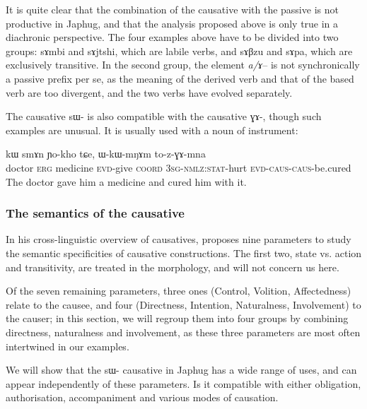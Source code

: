\documentclass[oldfontcommands,oneside,a4paper,11pt]{memoir}
\newcommand{\ipa}[1]{{\phon #1}} %
\newcommand{\wav}[1]{}%
\newcommand{\caus}{\textsc{caus}}
\newcommand{\coord}{\textsc{coord}}
\newcommand{\erg}{\textsc{erg}}
\newcommand{\evd}{\textsc{evd}}
\newcommand{\nmlz}{\textsc{nmlz}}
\newcommand{\sg}{\textsc{sg}}
\newcommand{\stat}{\textsc{stat}}
\begin{document}
It is quite clear that the combination of the causative with the passive is not productive in Japhug, and that the analysis proposed above is only true in a diachronic perspective. The four examples above have to be divided into two groups:   \ipa{sɤmbi} and \ipa{sɤjtshi}, which are labile verbs, and \ipa{sɤβzu} and \ipa{sɤpa}, which are exclusively transitive. In the second group,  the element \textit{a/ɤ}-- is not synchronically a passive prefix per se, as the meaning of the derived verb and that of the based verb are too divergent, and the two verbs have evolved separately.


The causative \ipa{sɯ-} is also compatible with the causative \ipa{ɣɤ-}, though such examples are unusual. It is usually used with a noun of instrument:
 \begin{exe}
\ex  \label{ex:double.caus}
\gll \ipa{smɤnba} 	\ipa{kɯ} 	\ipa{smɤn} 	\ipa{ɲo-kho} 	\ipa{tɕe,} 	\ipa{ɯ-kɯ-mŋɤm} 	\ipa{to-z-ɣɤ-mna}    \\
  doctor \erg{} medicine \evd{}-give \coord{} 3\sg{}-\nmlz{}:\stat{}-hurt \evd{}-\caus{}-\caus{}-be.cured \\
\glt The doctor gave him a medicine and cured him with it. \wav{8_zGAmna}
\end{exe}
 




 
 



\subsubsection{The semantics of the causative } \label{subsub:caus.semantics}
In his cross-linguistic overview of causatives, \citet[62-68]{dixon00causative} proposes nine parameters to study the semantic specificities of causative constructions. The first two, state vs. action and transitivity, are treated in the morphology, and will not concern us here. 

Of the seven remaining parameters, three ones (Control, Volition, Affectedness) relate to the causee, and four (Directness, Intention, Naturalness, Involvement) to the causer; in this section, we will regroup them into four groups by combining directness, naturalness and involvement, as these three parameters are most often intertwined in our examples.

 
 We will show that the \ipa{sɯ-} causative in Japhug has a wide range of uses, and can appear independently of these parameters. Is it compatible with either obligation, authorisation, accompaniment and various modes of causation. 
 
\end{document}
